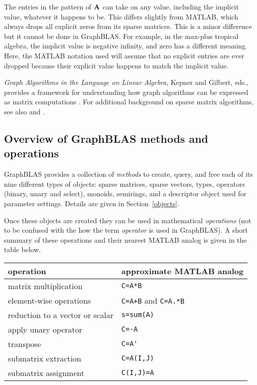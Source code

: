 \documentclass[12pt]{article}
\begin{document}
The entries in the pattern of ${\bf A}$ can take on any value, including the
implicit value, whatever it happens to be.  This differs slightly from MATLAB,
which always drops all explicit zeros from its sparse matrices.  This is a
minor difference but it cannot be done in GraphBLAS.  For example, in the
max-plus tropical algebra, the implicit value is negative infinity, and zero
has a different meaning.  Here, the MATLAB notation used will assume that no
explicit entries are ever dropped because their explicit value happens to match
the implicit value.

{\em Graph Algorithms in the Language on Linear Algebra}, Kepner and Gilbert,
eds., provides a framework for understanding how graph algorithms can be
expressed as matrix computations \cite{KepnerGilbert2011}.  For additional
background on sparse matrix algorithms, see also \cite{Davis06book} and
\cite{DavisRajamanickamSidLakhdar16}.

\subsection{Overview of GraphBLAS methods and operations} %
\label{overview}

GraphBLAS provides a collection of {\em methods} to create, query, and free
each of its nine different types of objects: sparse matrices, 
sparse vectors, types, operators (binary, unary and select), monoids,
semirings, and a descriptor object used for parameter settings.  Details are
given in Section~\ref{objects}.

Once these objects are created they can be used in mathematical {\em
operations} (not to be confused with the how the term {\em operator} is used in
GraphBLAS).  A short summary of these operations and their nearest MATLAB
analog is given in the table below.

\begin{tabular}{ll}
operation                           & approximate MATLAB analog \\
\hline
matrix multiplication               & \verb'C=A*B' \\
element-wise operations             & \verb'C=A+B' and \verb'C=A.*B' \\
reduction to a vector or scalar     & \verb's=sum(A)' \\
apply unary operator                & \verb'C=-A' \\
transpose                           & \verb"C=A'" \\
submatrix extraction                & \verb'C=A(I,J)' \\
submatrix assignment                & \verb'C(I,J)=A' \\
\hline
\end{tabular}
\vspace{0.1in}
\end{document}
